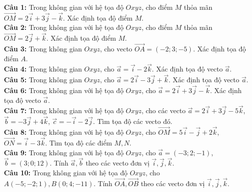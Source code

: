 \documentclass[12pt]{article}
\begin{document}
	\begin{btxanh}
		\noindent \textbf{Câu 1:} Trong không gian với hệ tọa độ $Oxyz$, cho điểm $M$ thỏa mãn $\vec{OM} = 2\vec{i} + 3\vec{j} - \vec{k}$. Xác định tọa độ điểm $M$. \\
		\noindent \textbf{Câu 2:} Trong không gian với hệ tọa độ $Oxyz$, cho điểm $M$ thỏa mãn $\vec{OM} = 2\vec{j} + \vec{k}$. Xác định tọa độ điểm $M$. \\
		\noindent \textbf{Câu 3:} Trong không gian $Oxyz$, cho vecto $\vec{OA} = (-2; 3; -5)$. Xác định tọa độ điểm $A$. \\
		\noindent \textbf{Câu 4:} Trong không gian $Oxyz$, cho $\vec{a} = \vec{i} - 2\vec{k}$. Xác định tọa độ vecto $\vec{a}$. \\
		\noindent \textbf{Câu 5:} Trong không gian $Oxyz$, cho $\vec{a} = 2\vec{i} - 3\vec{j} + \vec{k}$. Xác định tọa độ vecto $\vec{a}$. \\
		\noindent \textbf{Câu 6:} Trong không gian với hệ tọa độ $Oxyz$, cho $\vec{a} = 2\vec{i} + 3\vec{j} - \vec{k}$. Xác định tọa độ vecto $\vec{a}$. \\
		\noindent \textbf{Câu 7:} Trong không gian với hệ tọa độ $Oxyz$, cho các vecto $\vec{a} = 2\vec{i} + 3\vec{j} - 5\vec{k}$, $\vec{b} = -3\vec{j} + 4\vec{k}$, $\vec{c} = -\vec{i} - 2\vec{j}$. Tìm tọa độ các vecto đó. \\
		\noindent \textbf{Câu 8:} Trong không gian với hệ tọa độ $Oxyz$, cho $\vec{OM} = 5\vec{i} - \vec{j} + 2\vec{k}$, $\vec{ON} = \vec{i} - 3\vec{k}$. Tìm tọa độ các điểm $M, N$. \\
		\noindent \textbf{Câu 9:} Trong không gian với hệ tọa độ $Oxyz$, cho $\vec{a} = (-3; 2; -1)$, $\vec{b} = (3; 0; 12)$. Tính $\vec{a}, \vec{b}$ theo các vecto đơn vị $\vec{i}, \vec{j}, \vec{k}$. \\
		\noindent \textbf{Câu 10:} Trong không gian với hệ tọa độ $Oxyz$, cho $A(-5; -2; 1), B(0; 4; -11)$. Tính $\vec{OA}, \vec{OB}$ theo các vecto đơn vị $\vec{i}, \vec{j}, \vec{k}$.
	\end{btxanh}
	
\end{document}
